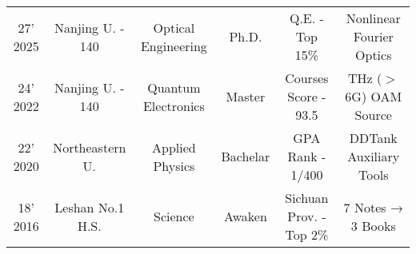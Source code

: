 {{\begin{minipage}{\linewidth}
\begin{tabularx}{\linewidth}{@{\extracolsep{\fill}} cccccc}
	27' 2025 & Nanjing U. - 140 & Optical Engineering \footnotemark[1] & Ph.D. & \href{https://eng.nju.edu.cn/df/d2/c4968a647122/page.psp}{\raisebox{-0.05\height}{\color{internet_blue}\faGlobe}} Q.E. - Top 15\% \href{https://youtu.be/9vrWQo7oZK4}{\raisebox{-0.05\height}{\color{youtube_red}\faYoutube}} & Nonlinear Fourier Optics \href{https://github.com/ChenZhu-Xie/PhD_academia}{\raisebox{-0.05\height}\faGithub} \\ 24' 2022 & Nanjing U. - 140 & Quantum Electronics & Master & Courses Score - 93.5 \href{https://github.com/ChenZhu-Xie/postgraduate_courses}{\raisebox{-0.05\height}\faGithub} & THz ($>$ 6G) OAM Source \href{https://github.com/ChenZhu-Xie/postgraduate_academia}{\raisebox{-0.05\height}\faGithub} \\ 22' 2020 & Northeastern U. & Applied Physics \footnotemark[2] & Bachelar & \href{http://cos.neu.edu.cn/2017/0731/c1129a30492/page.htm}{\raisebox{-0.05\height}{\color{internet_blue}\faGlobe}} GPA Rank - 1/400 \href{https://github.com/ChenZhu-Xie/undergraduate_courses}{\raisebox{-0.05\height}\faGithub} & DDTank Auxiliary Tools \href{https://youtu.be/yHp8ca3DrqY}{\raisebox{-0.05\height}{\color{youtube_red}\faYoutube}} \\ 18' 2016 & Leshan No.1 H.S. & Science & Awaken & Sichuan Prov. - Top 2\% & 7 Notes → 3 Books \href{https://github.com/ChenZhu-Xie/3_books_with_cpp}{\raisebox{-0.05\height}\faGithub}
\end{tabularx}
\end{minipage}

}}
